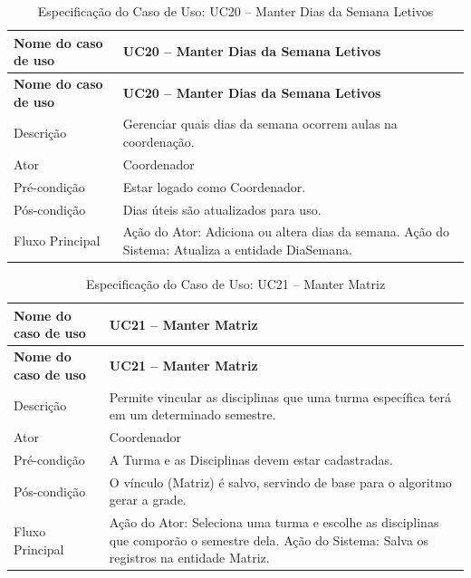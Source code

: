 \fonteautores

\vspace{\baselineskip}

\Needspace{0.48\textheight}
\begin{longtable}{|L{4.5cm}|L{10.5cm}|}
\caption{Especificação do Caso de Uso: UC20 -- Manter Dias da Semana Letivos} \\
\hline
\textbf{Nome do caso de uso} & \textbf{UC20 -- Manter Dias da Semana Letivos} \\
\hline
\endfirsthead
\hline
\textbf{Nome do caso de uso} & \textbf{UC20 -- Manter Dias da Semana Letivos} \\
\hline
\endhead
Descrição       & Gerenciar quais dias da semana ocorrem aulas na coordenação. \\
\hline
Ator            & Coordenador \\
\hline
Pré-condição    & Estar logado como Coordenador. \\
\hline
Pós-condição    & Dias úteis são atualizados para uso. \\
\hline
Fluxo Principal & Ação do Ator: Adiciona ou altera dias da semana. Ação do Sistema: Atualiza a entidade DiaSemana. \\
\hline
\end{longtable}

\fonteautores

\vspace{\baselineskip}

\Needspace{0.48\textheight}
\begin{longtable}{|L{4.5cm}|L{10.5cm}|}
\caption{Especificação do Caso de Uso: UC21 -- Manter Matriz} \\
\hline
\textbf{Nome do caso de uso} & \textbf{UC21 -- Manter Matriz} \\
\hline
\endfirsthead
\hline
\textbf{Nome do caso de uso} & \textbf{UC21 -- Manter Matriz} \\
\hline
\endhead
Descrição       & Permite vincular as disciplinas que uma turma específica terá em um determinado semestre. \\
\hline
Ator            & Coordenador \\
\hline
Pré-condição    & A Turma e as Disciplinas devem estar cadastradas. \\
\hline
Pós-condição    & O vínculo (Matriz) é salvo, servindo de base para o algoritmo gerar a grade. \\
\hline
Fluxo Principal & Ação do Ator: Seleciona uma turma e escolhe as disciplinas que comporão o semestre dela. Ação do Sistema: Salva os registros na entidade Matriz. \\
\hline
\end{longtable}

